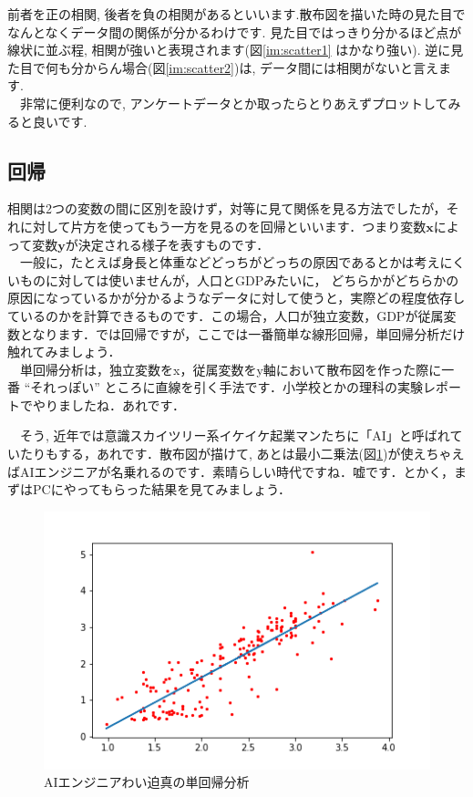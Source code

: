 \documentclass[11pt,a4paper]{jreport}
\begin{document}
前者を正の相関, 後者を負の相関があるといいます.散布図を描いた時の見た目でなんとなくデータ間の関係が分かるわけです. 見た目ではっきり分かるほど点が線状に並ぶ程, 相関が強いと表現されます(図\ref{im:scatter1} はかなり強い). 逆に見た目で何も分からん場合(図\ref{im:scatter2})は, データ間には相関がないと言えます. \\
　非常に便利なので, アンケートデータとか取ったらとりあえずプロットしてみると良いです. 
\\
\subsection{回帰}
相関は2つの変数の間に区別を設けず，対等に見て関係を見る方法でしたが，それに対して片方を使ってもう一方を見るのを回帰といいます．つまり変数$\mathbf{x}$によって変数$\mathbf{y}$が決定される様子を表すものです．\\
　一般に，たとえば身長と体重などどっちがどっちの原因であるとかは考えにくいものに対しては使いませんが，人口とGDPみたいに， どちらかがどちらかの原因になっているかが分かるようなデータに対して使うと，実際どの程度依存しているのかを計算できるものです．この場合，人口が独立変数，GDPが従属変数となります．では回帰ですが，ここでは一番簡単な線形回帰，単回帰分析だけ触れてみましょう．\\

　単回帰分析は，独立変数をx，従属変数をy軸において散布図を作った際に一番 ``それっぽい'' ところに直線を引く手法です．小学校とかの理科の実験レポートでやりましたね．あれです．

　そう, 近年では意識スカイツリー系イケイケ起業マンたちに「AI」と呼ばれていたりもする，あれです．散布図が描けて, あとは最小二乗法(図\ref{im:predict})が使えちゃえばAIエンジニアが名乗れるのです．素晴らしい時代ですね．嘘です．とかく，まずはPCにやってもらった結果を見てみましょう．\\


\begin{figure}[H]
\label{im:predict}
  \centering
  \includegraphics[width=120mm,bb=0 0 432 288]{../figures/predict.png}
  \caption{AIエンジニアわい迫真の単回帰分析}
\end{figure}
\end{document}
